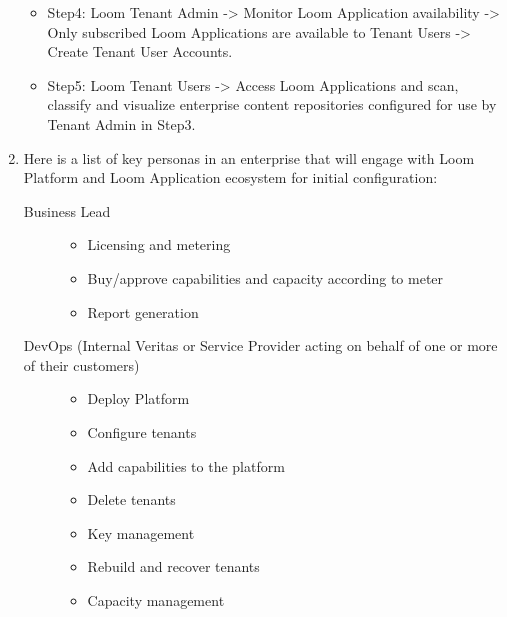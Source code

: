 \documentclass[letterpaper,10pt,english]{sphinxmanual}
\begin{document}
\begin{enumerate}
\begin{itemize}
\item {} 
Step4: Loom Tenant Admin -\textgreater{} Monitor Loom Application availability -\textgreater{} Only subscribed Loom Applications are available to Tenant Users -\textgreater{} Create Tenant User Accounts.

\item {} 
Step5: Loom Tenant Users -\textgreater{} Access Loom Applications and scan, classify and visualize enterprise content repositories configured for use by Tenant Admin in Step3.

\end{itemize}

\item {} 

Here is a list of key personas in an enterprise that will engage with Loom Platform and Loom Application ecosystem for initial configuration:
\begin{description}
\item[{Business Lead}] \leavevmode\begin{itemize}
\item {} 
Licensing and metering

\item {} 
Buy/approve capabilities and capacity according to meter

\item {} 
Report generation

\end{itemize}

\item[{DevOps (Internal Veritas or Service Provider acting on behalf of one or more of their customers)}] \leavevmode\begin{itemize}
\item {} 
Deploy Platform

\item {} 
Configure tenants

\item {} 
Add capabilities to the platform

\item {} 
Delete tenants

\item {} 
Key management

\item {} 
Rebuild and recover tenants

\item {} 
Capacity management


\end{itemize}
\end{description}
\end{enumerate}
\end{document}
